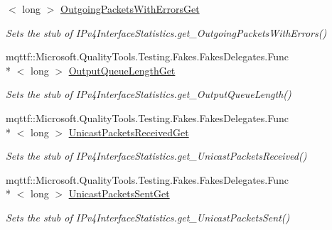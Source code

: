 \begin{DoxyCompactItemize}
$<$ long $>$ \hyperlink{class_system_1_1_net_1_1_network_information_1_1_fakes_1_1_stub_i_pv4_interface_statistics_ac6569fe8088b9faeed0ff6967b888e7c}{Outgoing\-Packets\-With\-Errors\-Get}
\begin{DoxyCompactList}\small\item\em Sets the stub of I\-Pv4\-Interface\-Statistics.\-get\-\_\-\-Outgoing\-Packets\-With\-Errors()\end{DoxyCompactList}\item 
mqttf\-::\-Microsoft.\-Quality\-Tools.\-Testing.\-Fakes.\-Fakes\-Delegates.\-Func\\*
$<$ long $>$ \hyperlink{class_system_1_1_net_1_1_network_information_1_1_fakes_1_1_stub_i_pv4_interface_statistics_a8457157b8a7f7ed309db931c47408df6}{Output\-Queue\-Length\-Get}
\begin{DoxyCompactList}\small\item\em Sets the stub of I\-Pv4\-Interface\-Statistics.\-get\-\_\-\-Output\-Queue\-Length()\end{DoxyCompactList}\item 
mqttf\-::\-Microsoft.\-Quality\-Tools.\-Testing.\-Fakes.\-Fakes\-Delegates.\-Func\\*
$<$ long $>$ \hyperlink{class_system_1_1_net_1_1_network_information_1_1_fakes_1_1_stub_i_pv4_interface_statistics_a4dc18aa1988fd7bf0ac15db8987cd335}{Unicast\-Packets\-Received\-Get}
\begin{DoxyCompactList}\small\item\em Sets the stub of I\-Pv4\-Interface\-Statistics.\-get\-\_\-\-Unicast\-Packets\-Received()\end{DoxyCompactList}\item 
mqttf\-::\-Microsoft.\-Quality\-Tools.\-Testing.\-Fakes.\-Fakes\-Delegates.\-Func\\*
$<$ long $>$ \hyperlink{class_system_1_1_net_1_1_network_information_1_1_fakes_1_1_stub_i_pv4_interface_statistics_a65f87713c1a0badf62a3dee82583ddcb}{Unicast\-Packets\-Sent\-Get}
\begin{DoxyCompactList}\small\item\em Sets the stub of I\-Pv4\-Interface\-Statistics.\-get\-\_\-\-Unicast\-Packets\-Sent()\end{DoxyCompactList}\end{DoxyCompactItemize}
